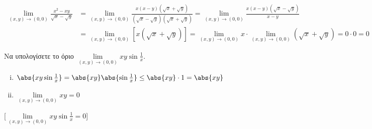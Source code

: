 \begin{example}
  \begin{align*}
    \lim\limits_{(x,y)\to (0, 0)} \frac{x^{2}-xy}{\sqrt{x} - \sqrt{y}} 
    &= \lim\limits_{(x,y)\to (0, 0)} \frac{x(x-y)(\sqrt{x} + \sqrt{y})}{(\sqrt{x} -
    \sqrt{y} )(\sqrt{x} + \sqrt{y})} = \lim\limits_{(x,y)\to (0, 0)}
    \frac{x(x-y)(\sqrt{x} - \sqrt{y} )}{x-y} \\
    &= \lim\limits_{(x,y)\to (0,0)} [x(\sqrt{x} + \sqrt{y})] = \lim\limits_{(x,y)\to
    (0, 0)} x \cdot \lim\limits_{(x,y)\to (0, 0)} (\sqrt{x} + \sqrt{y}) = 0 \cdot 0 = 0 
  \end{align*}
\end{example}




\begin{example}
  Να υπολογίσετε το όριο $ \lim\limits_{(x,y)\to (0, 0)} xy \sin{\frac{1}{x}} $. 

  \begin{solution}
  \item {}
    \begin{minipage}{0.4\textwidth}
      \begin{enumerate}[i)]
        \item $ \abs{xy \sin{\frac{1}{x}}} = \abs{xy} 
          \abs{\sin{\frac{1}{x}}} \leq \abs{xy} \cdot 1 = \abs{xy} $ 
          \hfill {}
        \item $ \lim\limits_{(x,y)\to (0, 0)} xy = 0$ \hfill {}
      \end{enumerate}
    \end{minipage}

    [$ \lim\limits_{(x,y)\to (0, 0)} xy 
    \sin{\frac{1}{x}} = 0$]
  \end{solution}
\end{example}


